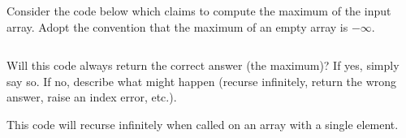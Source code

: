 \begin{prob}
    Consider the code below which claims to compute the maximum of the input array.
    Adopt the convention that the maximum of an empty array is $-\infty$.

    \inputminted{python}{./code.py}

    Will this code always return the correct answer (the maximum)? If yes, simply say
    so. If no, describe what might happen (recurse infinitely, return the wrong answer,
    raise an index error, etc.).

    \begin{soln}
        This code will recurse infinitely when called on an array with a single element.
    \end{soln}
\end{prob}
